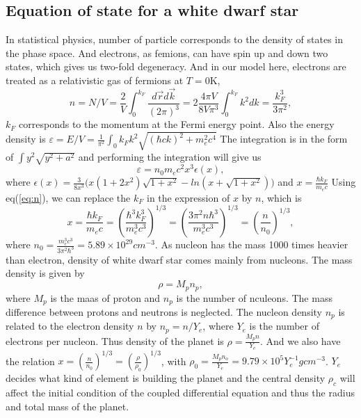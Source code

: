 \documentclass{article}
\begin{document}
\subsection{Equation of state for a white dwarf star}
In statistical physics, number of particle corresponds to the density of states in the phase space. And electrons, as femions, can have spin up and down two states, which gives us two-fold degeneracy. And in our model here, electrons are treated as a relativistic gas of fermions at $T=0$K,
\begin{equation}
n=N/V=\frac{2}{V}\int_{0}^{k_F}\frac{d\vec{r}d\vec{k}}{(2\pi)^3}=2\frac{4\pi V}{8V\pi^3} \int_{0}^{k_F}k^2dk=\frac{ k_F^3}{3\pi^2},
\label{eq:n}
\end{equation}
$k_F$ corresponds to the momentum at the Fermi energy point. Also the energy density is $\varepsilon =E/V=\frac{1}{\pi^2}\int_{0}{k_F}k^2\sqrt{(\hbar ck)^2 + m_e^2c^4}$
The integration is in the form of $\int y^2\sqrt{y^2+a^2}$ and performing the integration will give us 
\begin{equation}
 \varepsilon=n_0m_ec^2x^3 \epsilon(x),
\label{eq:energy_density}
\end{equation}
where $\epsilon(x)=\frac{3}{8x^3}\big(  x(1+2x^2)\sqrt{1+x^2} -ln(x+\sqrt{1+x^2})  \big)$ and $x=\frac{\hbar k_F}{m_e c}$
Using eq(\ref{eq:n}), we can replace the $k_F$ in the expression of $x$ by $n$, which is 
\begin{equation}
x=\frac{\hbar k_F}{m_ec} =(\frac{\hbar^3 k_F^3}{m_e^3c^3})^{1/3}=(\frac{3\pi^2n\hbar^3}{m_e^3c^3})^{1/3} =(\frac{n}{n_0})^{1/3},
\end{equation}
where $n_0=\frac{m_e^3 c^3}{3\pi^2 \hbar^3}=5.89 \times 10^{29} cm^{-3}$. As nucleon has the mass 1000 times heavier than electron, density of white dwarf star comes mainly from nucleons.  The mass density is given by
\begin{equation}
\rho = M_p n_p,
\end{equation}
where $M_p$ is the maas of proton and $n_p$ is the number of nculeons. The mass difference between protons and neutrons is neglected. The nucleon density $n_p$ is related to the electron density $n$ by $n_p=n/Y_e$, where $Y_e$ is the number of electrons per nucleon. Thus density of the planet is $\rho = \frac{M_p n}{Y_e}$. And we also have the relation $x =(\frac{n}{n_0})^{1/3} = (\frac{\rho}{\rho_0})^{1/3}$, with $\rho_0 =\frac{M_p n_o}{Y_e}= 9.79\times 10^5 Y_e^{-1}g cm^{-3}$. $Y_e$ decides what kind of element is building the planet  and the central density $\rho_c$ will affect the initial condition of the coupled differential equation and thus the radius and total mass of the planet.
\end{document}
